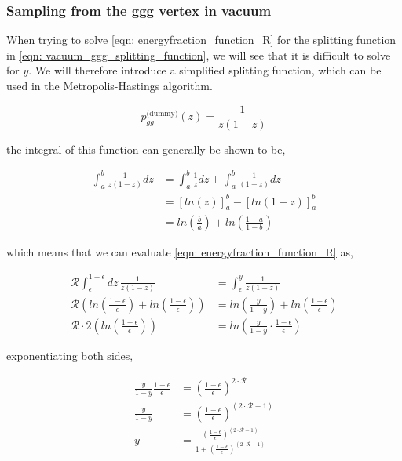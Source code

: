 \documentclass[main.tex]{subfiles}
\begin{document}
\subsubsection{Sampling from the ggg vertex in vacuum}
When trying to solve \autoref{eqn: energyfraction_function_R} for the \ggg splitting function in \autoref{eqn: vacuum_ggg_splitting_function}, we will see that it is difficult to solve for \(y\). We will therefore introduce a simplified splitting function, which can be used in the Metropolis-Hastings algorithm.

\begin{equation}\label{eqn: p_ggg_vacuum_dummy}
    p^{\text{(dummy)}}_{gg}(z) = \frac{1}{z(1-z)}
\end{equation}

the integral of this function can generally be shown to be, 

\begin{align}
    \int_a^b \frac{1}{z(1-z)}dz &= \int_a^b \frac{1}{z}dz + \int_a^b \frac{1}{(1-z)}dz \nonumber\\
    &= \left[ ln (z)\right]_a^b - \left[ln(1-z) \right]_a^b  \nonumber\\
    &= ln (\frac{b}{a}) + ln(\frac{1-a}{1-b})
\end{align}

which means that we can evaluate \autoref{eqn: energyfraction_function_R} as,

\begin{align}
    \mathcal{R} \int_\epsilon^{1-\epsilon} dz \, \frac{1}{z(1-z)} &= \int_\epsilon^{y} \frac{1}{z(1-z)}  \nonumber\\
    \mathcal{R} \left(  ln (\frac{1-\epsilon}{\epsilon}) + ln(\frac{1-\epsilon}{\epsilon}) \right) &= ln (\frac{y}{1-y}) + ln(\frac{1-\epsilon}{\epsilon}) \nonumber\\
    \mathcal{R} \cdot 2 \left( ln (\frac{1-\epsilon}{\epsilon}) \right) &= ln (\frac{y}{1-y} \cdot \frac{1-\epsilon}{\epsilon})
\end{align}

exponentiating both sides, 

\begin{align}\label{eqn: MC_energyfraction_origin_vacuum}
    \frac{y}{1-y} \frac{1-\epsilon}{\epsilon} &= \left(\frac{1-\epsilon}{\epsilon}\right)^{2\cdot \mathcal{R}} \nonumber\\
    \frac{y}{1-y} &= \left(\frac{1-\epsilon}{\epsilon}\right)^{(2\cdot \mathcal{R}-1)} \nonumber\\
    y &= \frac{\left(\frac{1-\epsilon}{\epsilon}\right)^{(2\cdot \mathcal{R}-1)}}{1+\left(\frac{1-\epsilon}{\epsilon}\right)^{(2\cdot \mathcal{R}-1)}}
\end{align}
\end{document}
